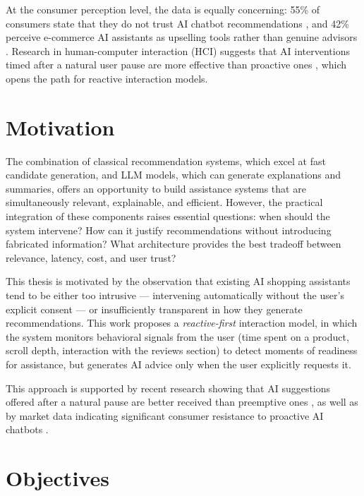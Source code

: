 \par At the consumer perception level, the data is equally concerning: 55\% of consumers state that they do not trust AI chatbot recommendations \cite{ConsumerDistrust2025}, and 42\% perceive e-commerce AI assistants as upselling tools rather than genuine advisors \cite{AIUpsell2025}. Research in human-computer interaction (HCI) suggests that AI interventions timed after a natural user pause are more effective than proactive ones \cite{CHI2024Timing}, which opens the path for reactive interaction models.


\section{Motivation}
\label{sec:intro-motivation}

\par The combination of classical recommendation systems, which excel at fast candidate generation, and LLM models, which can generate explanations and summaries, offers an opportunity to build assistance systems that are simultaneously relevant, explainable, and efficient. However, the practical integration of these components raises essential questions: when should the system intervene? How can it justify recommendations without introducing fabricated information? What architecture provides the best tradeoff between relevance, latency, cost, and user trust?

\par This thesis is motivated by the observation that existing AI shopping assistants tend to be either too intrusive --- intervening automatically without the user's explicit consent --- or insufficiently transparent in how they generate recommendations. This work proposes a \textit{reactive-first} interaction model, in which the system monitors behavioral signals from the user (time spent on a product, scroll depth, interaction with the reviews section) to detect moments of readiness for assistance, but generates AI advice only when the user explicitly requests it.

\par This approach is supported by recent research showing that AI suggestions offered after a natural pause are better received than preemptive ones \cite{CHI2024Timing}, as well as by market data indicating significant consumer resistance to proactive AI chatbots \cite{ConsumerResistanceAI}.


\section{Objectives}
\label{sec:intro-objectives}

